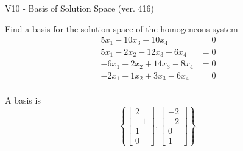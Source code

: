 \begin{exercise}
  \begin{exerciseTitle}V10 - Basis of Solution Space (ver. 416)\end{exerciseTitle}
  \begin{exerciseStatement}
    Find a basis for the solution space of the homogeneous system 
\begin{align*}
 5 x_ 1 -10 x_ 3 + 10 x_ 4 &= 0  \\ 
  5 x_ 1 -2 x_ 2 -12 x_ 3 + 6 x_ 4 &= 0  \\ 
  -6 x_ 1 + 2 x_ 2 + 14 x_ 3 -8 x_ 4 &= 0  \\ 
  -2 x_ 1 -1 x_ 2 + 3 x_ 3 -6 x_ 4 &= 0  \\ 
 \end{align*}


 
  \end{exerciseStatement}

  \begin{exerciseAnswer}
   A basis is   
\[\left\{\left[\begin{array}{c}
2 \\
-1 \\
1 \\
0
\end{array}\right] , \left[\begin{array}{c}
-2 \\
-2 \\
0 \\
1
\end{array}\right]\right\}.\]

  


  \end{exerciseAnswer}
\end{exercise}